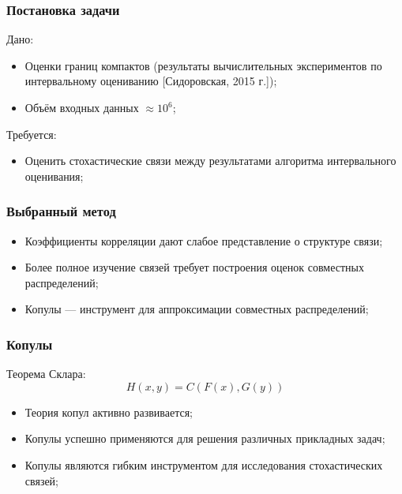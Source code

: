 \documentclass[11pt]{beamer}
\begin{document}
\begin{frame}
\frametitle{Постановка задачи}
Дано:
\begin{itemize}
  \item Оценки границ компактов (результаты вычислительных экспериментов по интервальному оцениванию [Сидоровская, 2015 г.]);
  \item Объём входных данных $\approx 10^6$;
\end{itemize}

Требуется:
\begin{itemize}
  \item Оценить стохастические связи между результатами алгоритма интервального оценивания;
\end{itemize}
\end{frame}

\begin{frame}
\frametitle{Выбранный метод}
\begin{itemize}
  \item Коэффициенты корреляции дают слабое представление о структуре связи;
  \item Более полное изучение связей требует построения оценок совместных распределений;
  \item Копулы --- инструмент для аппроксимации совместных распределений;
\end{itemize}
\end{frame}

\begin{frame}
\begin{center}
\frametitle{Копулы}
Теорема Склара:
\begin{equation}
H(x, y) = C(F(x), G(y))
\end{equation}
\begin{itemize}
  \item Теория копул активно развивается;
  \item Копулы успешно применяются для решения различных прикладных задач;
  \item Копулы являются гибким инструментом для исследования стохастических связей;
\end{itemize}
\end{center}
\end{frame}
\end{document}
